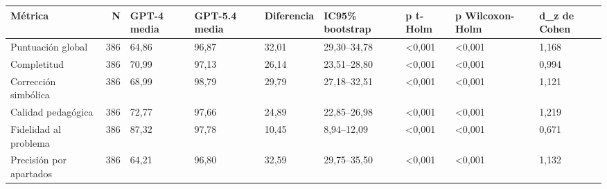 \begin{tabular}{lrlllllll}
\toprule
Métrica & N & GPT-4 media & GPT-5.4 media & Diferencia & IC95\% bootstrap & p t-Holm & p Wilcoxon-Holm & d\_z de Cohen \\
\midrule
Puntuación global & 386 & 64,86 & 96,87 & 32,01 & 29,30–34,78 & <0,001 & <0,001 & 1,168 \\
Completitud & 386 & 70,99 & 97,13 & 26,14 & 23,51–28,80 & <0,001 & <0,001 & 0,994 \\
Corrección simbólica & 386 & 68,99 & 98,79 & 29,79 & 27,18–32,51 & <0,001 & <0,001 & 1,121 \\
Calidad pedagógica & 386 & 72,77 & 97,66 & 24,89 & 22,85–26,98 & <0,001 & <0,001 & 1,219 \\
Fidelidad al problema & 386 & 87,32 & 97,78 & 10,45 & 8,94–12,09 & <0,001 & <0,001 & 0,671 \\
Precisión por apartados & 386 & 64,21 & 96,80 & 32,59 & 29,75–35,50 & <0,001 & <0,001 & 1,132 \\
\bottomrule
\end{tabular}
